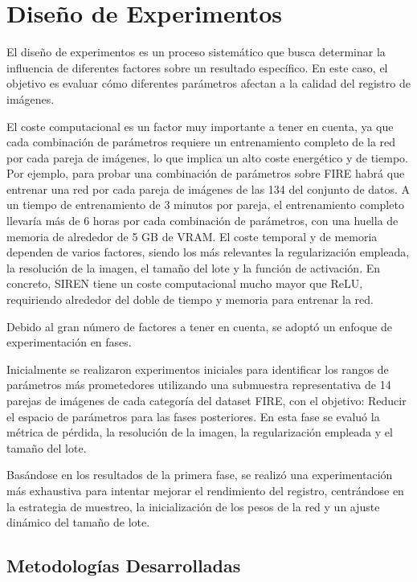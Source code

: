 \section{Diseño de Experimentos}
\label{sec:Diseño de Experimentos}

El diseño de experimentos es un proceso sistemático que busca determinar la influencia de diferentes factores sobre un resultado específico. En este caso, el objetivo es evaluar cómo diferentes parámetros afectan a la calidad del registro de imágenes.

El coste computacional es un factor muy importante a tener en cuenta, ya que cada combinación de parámetros requiere un entrenamiento completo de la red por cada pareja de imágenes, lo que implica un alto coste energético y de tiempo.
Por ejemplo, para probar una combinación de parámetros sobre FIRE habrá que entrenar una red por cada pareja de imágenes de las 134 del conjunto de datos.
A un tiempo de entrenamiento de 3 minutos por pareja, el entrenamiento completo llevaría más de 6 horas por cada combinación de parámetros, con una huella de memoria de alrededor de 5 GB de VRAM.
El coste temporal y de memoria dependen de varios factores, siendo los más relevantes la regularización empleada, la resolución de la imagen, el tamaño del lote y la función de activación.
En concreto, SIREN tiene un coste computacional mucho mayor que ReLU, requiriendo alrededor del doble de tiempo y memoria para entrenar la red.

Debido al gran número de factores a tener en cuenta, se adoptó un enfoque de experimentación en fases.

Inicialmente se realizaron experimentos iniciales para identificar los rangos de parámetros más prometedores utilizando una submuestra representativa de 14 parejas de imágenes de cada categoría del dataset FIRE, con el objetivo: Reducir el espacio de parámetros para las fases posteriores.
En esta fase se evaluó la métrica de pérdida, la resolución de la imagen, la regularización empleada y el tamaño del lote.

Basándose en los resultados de la primera fase, se realizó una experimentación más exhaustiva para intentar mejorar el rendimiento del registro, centrándose en la estrategia de muestreo, la inicialización de los pesos de la red y un ajuste dinámico del tamaño de lote.

\subsection{Metodologías Desarrolladas}
\label{subsec:Metodoloxías Desenvoltas}

